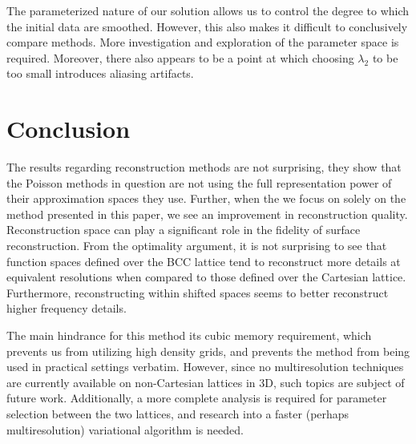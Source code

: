 The parameterized nature of our solution allows us to control the degree to which the initial data are smoothed. However, this also makes it difficult to conclusively compare methods. More investigation and exploration of the parameter space is required. Moreover, there also appears to be a point at which choosing $\lambda_2$ to be too small introduces aliasing artifacts.  


\section{Conclusion}
The results regarding reconstruction methods are not surprising, they show that the Poisson methods in question are not using the full representation power of their approximation spaces they use. Further, when the we focus on solely on the method presented in this paper, we see an improvement in reconstruction quality. Reconstruction space can play a significant role in the fidelity of surface reconstruction. From the optimality argument, it is not surprising to see that function spaces defined over the BCC lattice tend to reconstruct more details at equivalent resolutions when compared to those defined over the Cartesian lattice. Furthermore, reconstructing within shifted spaces seems to better reconstruct higher frequency details.

The main hindrance for this method its cubic memory requirement, which prevents us from utilizing high density grids, and prevents the method from being used in practical settings verbatim. However, since no multiresolution techniques are currently available on non-Cartesian lattices in 3D, such topics are subject of future work. Additionally, a more complete analysis is required for parameter selection between the two lattices, and research into a faster (perhaps multiresolution) variational algorithm is needed.
